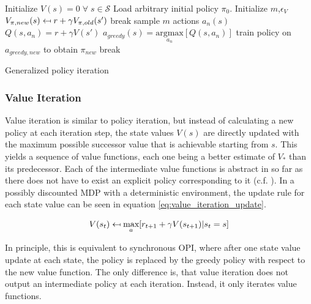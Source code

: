 \begin{algorithm}[hbt]
	\begin{algorithmic}[0] %
		\State Initialize $V(s) = 0 \; \forall \; s \in \mathcal{S}$
		\State Load arbitrary initial policy $\pi_0$.
		\State Initialize $m$,\;$\epsilon_V$
		\State $V_{\pi,new}(s) \mathrel{\reflectbox{\ensuremath{\mapsto}}} r+\gamma V_ {\pi,old}(s')$
		\EndFor
		\State break
		\EndIf
		\EndWhile
		\EndFunction
		\State sample $m$ actions $a_n(s)$
		\State $Q(s,a_n) = r + \gamma V(s')$
		\EndFor
		\State $a_{greedy}(s)=\underset{a_n}{\text{argmax}}[Q(s,a_n)]$
		\EndFor
		\EndFunction
		\State
		\State train policy on $a_{greedy,new}$ to obtain $\pi_{new}$
		\State break
		\EndIf
		
		\EndWhile
		\State
		\EndFunction
	\end{algorithmic}
	\caption{Generalized policy iteration}
	\label{algo:gpi}
\end{algorithm}

\subsubsection{Value Iteration}
\label{subsection:VI}
Value iteration is similar to policy iteration, but instead of calculating a new policy at each iteration step, the state values $V(s)$ are directly updated with the maximum possible successor value that is achievable starting from $s$. This yields a sequence of value functions, each one being a better estimate of $V_*$ than its predecessor. Each of the intermediate value functions is abstract in so far as there does not have to exist an explicit policy corresponding to it (c.f. \cite[lecture~3]{Silver2015}). In a possibly discounted MDP with a deterministic environment, the update rule for each state value can be seen in equation \ref{eq:value_iteration_update}.

\begin{equation}
V(s_t) \mathrel{\reflectbox{\ensuremath{\mapsto}}} 
\underset{a}{\text{max}}[r_{t+1}+\gamma V(s_{t+1})|s_t=s]
\label{eq:value_iteration_update}
\end{equation}

In principle, this is equivalent to synchronous OPI, where after one state value update at each state, the policy is replaced by the greedy policy with respect to the new value function. The only difference is, that value iteration does not output an intermediate policy at each iteration. Instead, it only iterates value functions. 


